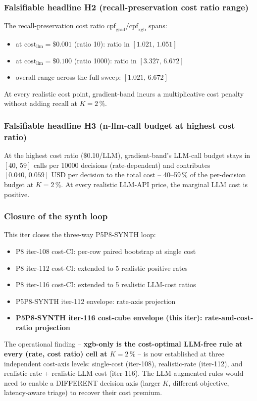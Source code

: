 \documentclass{article}
\begin{document}
\subsubsection{Falsifiable headline H2 (recall-preservation cost ratio range)}
The recall-preservation cost ratio
$\mathrm{cpf}_{\mathrm{grad}}/\mathrm{cpf}_{\mathrm{xgb}}$ spans:
\begin{itemize}
  \item at $\mathrm{cost}_{\mathrm{llm}}{=}\$0.001$ (ratio 10):
        ratio in $[1.021,\,1.051]$
  \item at $\mathrm{cost}_{\mathrm{llm}}{=}\$0.100$ (ratio 1000):
        ratio in $[3.327,\,6.672]$
  \item overall range across the full sweep: $[1.021,\,6.672]$
\end{itemize}
At every realistic cost point, gradient-band incurs a multiplicative
cost penalty without adding recall at $K{=}2\,\%$.

\subsubsection{Falsifiable headline H3 (n-llm-call budget at highest cost ratio)}
At the highest cost ratio (\$0.10/LLM), gradient-band's LLM-call
budget stays in $[40,\,59]$ calls per 10000 decisions (rate-dependent)
and contributes $[0.040,\,0.059]$ USD per decision to the total cost
-- 40--59\,\% of the per-decision budget at $K{=}2\,\%$. At every
realistic LLM-API price, the marginal LLM cost is positive.

\subsubsection{Closure of the synth loop}
This iter closes the three-way P5P8-SYNTH loop:
\begin{itemize}
  \item P8 iter-108 cost-CI: per-row paired bootstrap at single cost
  \item P8 iter-112 cost-CI: extended to 5 realistic positive rates
  \item P8 iter-116 cost-CI: extended to 5 realistic LLM-cost ratios
  \item P5P8-SYNTH iter-112 envelope: rate-axis projection
  \item \textbf{P5P8-SYNTH iter-116 cost-cube envelope (this iter):
        rate-and-cost-ratio projection}
\end{itemize}
The operational finding -- \textbf{xgb-only is the cost-optimal LLM-free
rule at every (rate, cost ratio) cell at $K{=}2\,\%$} -- is now
established at three independent cost-axis levels: single-cost
(iter-108), realistic-rate (iter-112), and realistic-rate +
realistic-LLM-cost (iter-116). The LLM-augmented rules would
need to enable a DIFFERENT decision axis (larger $K$, different
objective, latency-aware triage) to recover their cost premium.
\end{document}

